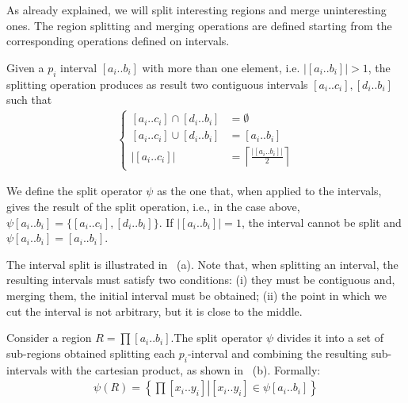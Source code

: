 As already explained, we will split interesting regions and merge uninteresting ones. The region splitting and merging operations are defined starting from the corresponding operations defined on intervals.
\begin{definition}
Given a $p_i$ interval $\left[a_{i}..b_{i}\right]$ with more than one element, i.e. $\left|\left[a_{i}..b_{i}\right]\right|>1$, the splitting operation produces as result two contiguous intervals $\left[a_{i}..c_{i}\right],\left[d_{i}..b_{i}\right]$
 such that
	\begin{align}
		\begin{cases}
		\left[a_{i}..c_{i}\right]\cap\left[d_{i}..b_{i}\right] & =\emptyset\\
		\left[a_{i}..c_{i}\right]\cup\left[d_{i}..b_{i}\right] & =\left[a_{i}..b_{i}\right]\\
		\left|\left[a_{i}..c_{i}\right]\right| & =\left\lceil \frac{\left|\left[a_{i}..b_{i}\right]\right|}{2}\right\rceil 
		\end{cases}
	\end{align}

We define the split operator $\psi$ as the one that, when applied to the intervals, gives the result of the split operation, i.e., in the case above, $\psi \left[a_{i}..b_{i}\right]=\lbrace \left[a_{i}..c_{i}\right],\left[d_{i}..b_{i}\right] \rbrace$.
If $\left|\left[a_{i}..b_{i}\right]\right|=1$, the interval
cannot be split and $\psi \left[a_{i}..b_{i}\right]=\left[a_{i}..b_{i}\right]$.
\end{definition}

The interval split is illustrated in ~(a). Note that, when splitting an interval, the resulting intervals must satisfy two conditions: (i) they must be contiguous and, merging them, the initial interval must be obtained; (ii) the point in which we cut the interval is not arbitrary, but it is close to the middle.

\begin{definition}
Consider a region $R=\prod\left[a_{i}..b_{i}\right]$.The split operator $\psi$ divides it into a set of sub-regions obtained splitting each $p_i$-interval and combining the resulting sub-intervals with the cartesian product, as shown in ~(b). Formally:
	\begin{align}
		\psi(R) = \left\{ \left.\prod\left[x_{i}..y_{i}\right]\right|\left[x_{i}..y_{i}\right]\in \psi\left[a_{i}..b_{i}\right]  \right\} 
	\end{align}

\end{definition}



